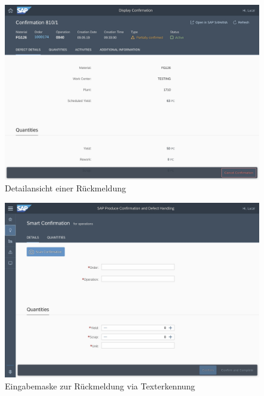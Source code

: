 \begin{figure}[H]
	\centering 
	\includegraphics[width=1.2\textwidth, angle =90 ]{img/stornieren.jpg}	
	\caption[Detailansicht einer Rückmeldung]{\label{fig:Detailansicht einer Rückmeldung}Detailansicht einer Rückmeldung
	}
\end{figure}
\begin{figure}[H]
	\centering 
	\includegraphics[width=1.2\textwidth, angle =90 ]{img/scanner.jpg}	
	\caption[Eingabemaske zur Rückmeldung via Texterkennung]{\label{fig:Eingabemaske zur Rückmeldung via Texterkennung}Eingabemaske zur Rückmeldung via Texterkennung
	}
\end{figure}


